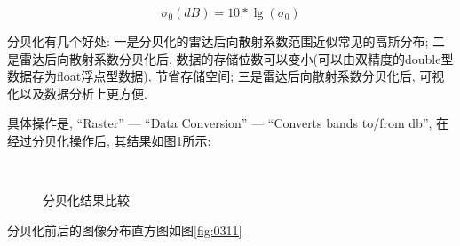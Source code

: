 \begin{equation}
    \sigma_{0}(dB)=10*\lg(\sigma_{0})
\end{equation}

分贝化有几个好处: 一是分贝化的雷达后向散射系数范围近似常见的高斯分布; 二是雷达后向散射系数分贝化后, 数据的存储位数可以变小(可以由双精度的double型数据存为float浮点型数据), 节省存储空间; 三是雷达后向散射系数分贝化后, 可视化以及数据分析上更方便.

具体操作是, ``Raster'' --- ``Data Conversion'' --- ``Converts bands to/from db'', 在经过分贝化操作后, 其结果如图\ref{fig:0310}所示:

\begin{figure}[htbp]
    \centering
    \\[12pt]
    \caption{分贝化结果比较}
    \label{fig:0310}
\end{figure}

分贝化前后的图像分布直方图如图\ref{fig:0311}

